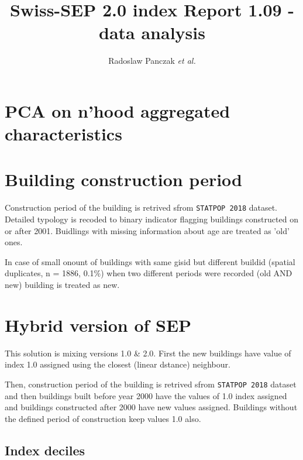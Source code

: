 \documentclass[a4paper, notitlepage, fleqn]{article} %
\title{\textbf{Swiss-SEP 2.0 index \endgraf 
Report 1.09 - data analysis}}
\author{Radoslaw Panczak \textit{et al.}}
\begin{document}
\maketitle
\tableofcontents
\newpage
\section{PCA on n'hood aggregated characteristics}
\begin{stlog}\end{stlog}
\newpage
\section{Building construction period}

Construction period of the building is retrived sfrom \texttt{STATPOP 2018} dataset. Detailed typology is recoded to binary indicator flagging buildings constructed on or after 2001. Buidlings with missing information about age are treated as 'old' ones. 

In case of small onount of buildings with same gisid but different buildid 
(spatial duplicates, n = 1886, 0.1\%) 
when two different periods were recorded (old AND new) building is treated as new. 
\begin{stlog}\end{stlog}
\newpage
\section{Hybrid version of SEP}

This solution is mixing versions 1.0 \& 2.0. First the new buildings have value of index 1.0 assigned using the closest (linear dstance) neighbour. 

Then, construction period of the building is retrived sfrom \texttt{STATPOP 2018} dataset and then buildings built before year 2000 have the values of 1.0 index assigned and buildings constructed after 2000 have new values assigned. Buildings without the defined period of construction keep values 1.0 also. 
\subsection{Index deciles}
\begin{stlog}\end{stlog}
\end{document}
